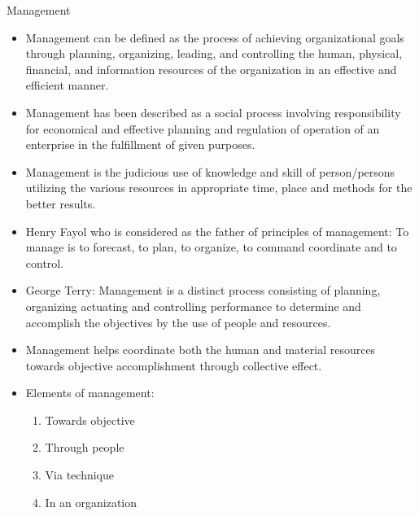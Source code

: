 \documentclass[12pt,ignorenonframetext,aspectratio=169]{beamer}
\providecommand{\tightlist}{%
  \setlength{\itemsep}{0pt}\setlength{\parskip}{0pt}}
\begin{document}
\begin{frame}{Management}
\protect\hypertarget{management}{}
\footnotesize

\begin{itemize}
\tightlist
\item
  Management can be defined as the process of achieving organizational
  goals through planning, organizing, leading, and controlling the
  human, physical, financial, and information resources of the
  organization in an effective and efficient manner.
\item
  Management has been described as a social process involving
  responsibility for economical and effective planning and regulation of
  operation of an enterprise in the fulfillment of given purposes.
\item
  Management is the judicious use of knowledge and skill of
  person/persons utilizing the various resources in appropriate time,
  place and methods for the better results.
\item
  Henry Fayol who is considered as the father of principles of
  management: To manage is to forecast, to plan, to organize, to command
  coordinate and to control.
\end{itemize}
\end{frame}

\begin{frame}{}
\protect\hypertarget{section}{}
\begin{itemize}
\tightlist
\item
  George Terry: Management is a distinct process consisting of planning,
  organizing actuating and controlling performance to determine and
  accomplish the objectives by the use of people and resources.
\item
  Management helps coordinate both the human and material resources
  towards objective accomplishment through collective effect.
\item
  Elements of management:

  \begin{enumerate}
  \tightlist
  \item
    Towards objective
  \item
    Through people
  \item
    Via technique
  \item
    In an organization
  \end{enumerate}
\end{itemize}
\end{frame}
\end{document}
